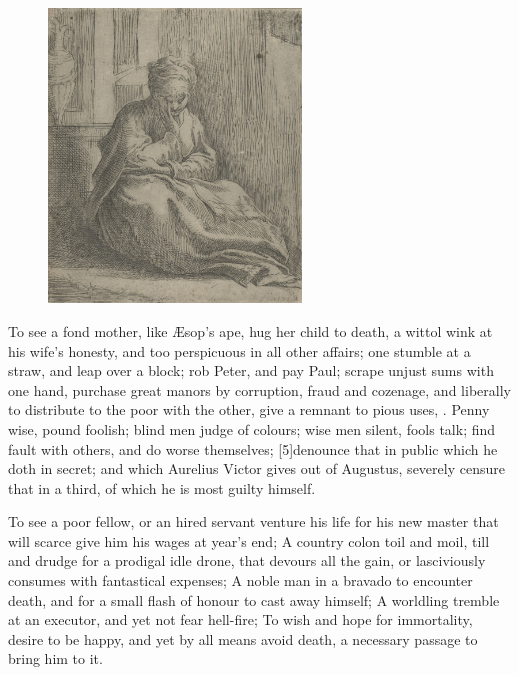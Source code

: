 {\begin{figure}[b]
  \begingroup
  \centering
  \includegraphics[keepaspectratio,width=0.6\textwidth]{figures/thais-small.jpg}
  \label{fig:thais}
\end{figure}

To see a fond mother, like \AE{}sop's ape, hug her child to death, a 
wittol wink at his wife's honesty, and too perspicuous in all other
affairs; one stumble at a straw, and leap over a block; rob Peter, and
pay Paul; scrape unjust sums with one hand, purchase great manors by
corruption, fraud and cozenage, and liberally to distribute to the poor
with the other, give a remnant to pious uses, \etc{}. Penny wise, pound
foolish; blind men judge of colours; wise men silent, fools talk; 
find fault with others, and do worse themselves; [5\baselineskip]denounce that in
public which he doth in secret; and which Aurelius Victor gives out of
Augustus, severely censure that in a third, of which he is most guilty
himself.

To see a poor fellow, or an hired servant venture his life for his new
master that will scarce give him his wages at year's end; A country
colon toil and moil, till and drudge for a prodigal idle drone, that
devours all the gain, or lasciviously consumes with fantastical
expenses; A noble man in a bravado to encounter death, and for a small
flash of honour to cast away himself; A worldling tremble at an
executor, and yet not fear hell-fire; To wish and hope for immortality,
desire to be happy, and yet by all means avoid death, a necessary
passage to bring him to it.

}
